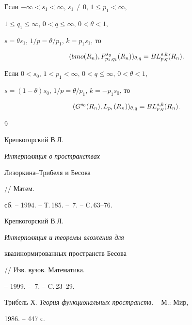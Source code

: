 \begin{thm} 


Если $-\infty<s_1<\infty$, $s_1\ne 0$, $1\le p_1<\infty$,


$1\le q_1\le \infty$, $0<q\le \infty$, $0<\theta <1$,


$s=\theta s_1$, $1/p=\theta/p_1$, $k=p_1s_1$, то


$$


(bmo(R_n), F^{s_0}_{p_1,q_1}(R_n))_{\theta,q}=B\Li(R_n).


$$


\end{thm} 





\begin{thm}  


Если $0<s_0$, $1<p_1<\infty$, $0<q\le \infty$, $0<\theta<1$,


$s=(1-\theta)s_0$, $1/p=\theta /p_1$, $k=-p_1s_0$, то


$$


(G^{s_0}(R_n), L_{p_1}(R_n))_{\theta,q}=B\Li (R_n).


$$


\end{thm} 





\begin{thebibliography}{9}







Крепкогорский В.Л. {\em Интерполяция в пространствах


Лизоркина--Трибеля и Бесова} // Матем.


сб. -- 1994. -- Т.\,185. -- \No\,7. -- C.\,63--76.




Крепкогорский В.Л. {\em Интерполяция и теоремы вложения для


квазинормированных пространств Бесова} // Изв. вузов. Математика.


-- 1999. -- \No\,7. -- C.\,23--29.




Трибель Х. {\em Теория функциональных пространств}. -- М.: Мир,


1986. -- 447 с.





\end{thebibliography}





\vskip 2cm














\label{end}





